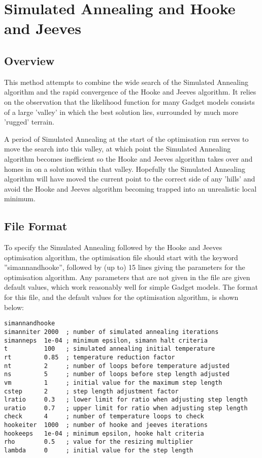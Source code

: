 \documentclass [a4paper, 10pt]{book}
\begin{document}
\section{Simulated Annealing and Hooke and Jeeves}\label{sec:simannandhooke}
\subsection{Overview}\label{subsec:simannandhookeover}
This method attempts to combine the wide search of the Simulated Annealing algorithm and the rapid convergence of the Hooke and Jeeves algorithm.  It relies on the observation that the likelihood function for many Gadget models consists of a large 'valley' in which the best solution lies, surrounded by much more 'rugged' terrain.

\bigskip
A period of Simulated Annealing at the start of the optimisation run serves to move the search into this valley, at which point the Simulated Annealing algorithm becomes inefficient so the Hooke and Jeeves algorithm takes over and homes in on a solution within that valley.  Hopefully the Simulated Annealing algorithm will have moved the current point to the correct side of any 'hills' and avoid the Hooke and Jeeves algorithm becoming trapped into an unrealistic local minimum.

\subsection{File Format}\label{subsec:simannandhookefile}
To specify the Simulated Annealing followed by the Hooke and Jeeves optimisation algorithm, the optimisation file should start with the keyword ''simannandhooke'', followed by (up to) 15 lines giving the parameters for the optimisation algorithm.  Any parameters that are not given in the file are given default values, which work reasonably well for simple Gadget models.  The format for this file, and the default values for the optimisation algorithm, is shown below:

{\small\begin{verbatim}
simannandhooke
simanniter 2000  ; number of simulated annealing iterations
simanneps  1e-04 ; minimum epsilon, simann halt criteria
t          100   ; simulated annealing initial temperature
rt         0.85  ; temperature reduction factor
nt         2     ; number of loops before temperature adjusted
ns         5     ; number of loops before step length adjusted
vm         1     ; initial value for the maximum step length
cstep      2     ; step length adjustment factor
lratio     0.3   ; lower limit for ratio when adjusting step length
uratio     0.7   ; upper limit for ratio when adjusting step length
check      4     ; number of temperature loops to check
hookeiter  1000  ; number of hooke and jeeves iterations
hookeeps   1e-04 ; minimum epsilon, hooke halt criteria
rho        0.5   ; value for the resizing multiplier
lambda     0     ; initial value for the step length
\end{verbatim}}
\end{document}
